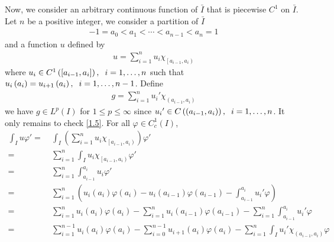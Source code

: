 \documentclass[a4paper,oneside]{article}
\numberwithin{equation}{section}
\begin{document}
\begin{enumerate}
Now, we consider an arbitrary continuous function of $\bar{I}$ that is piecewise $C^1$ on $\bar{I}$. Let $n$ be a positive integer, we consider a partition of $\bar{I}$ 
\begin{align}
- 1 = {a_0} < {a_1} <  \cdots  < {a_{n - 1}} < {a_n} = 1
\end{align}
and a function $u$ defined by
\begin{align}
u = \sum\limits_{i = 1}^n {{u_i}{\chi _{\left[ {{a_{i - 1}},{a_i}} \right)}}} 
\end{align}
where ${u_i} \in {C^1}\left( {\left[ {{a_{i - 1}},{a_i}} \right]} \right),\hspace{0.2cm} i = 1, \ldots ,n$ such that ${u_i}\left( {{a_i}} \right) = {u_{i + 1}}\left( {{a_i}} \right),\hspace{0.2cm}i = 1, \ldots ,n - 1$. Define 
\begin{align}
g = \sum\limits_{i = 1}^n {{u_i}'{\chi _{\left( {{a_{i - 1}},{a_i}} \right)}}} 
\end{align}
we have $g \in {L^p}\left( I \right)$ for $1\le p\le \infty$ since ${u_i}' \in C\left( {\left( {{a_{i - 1}},{a_i}} \right)} \right),\hspace{0.2cm} i = 1, \ldots ,n$. It only remains to check \eqref{1.5}. For all $\varphi \in C_c^1\left(I\right)$,
\begin{align}
\int_I {u\varphi '}  =&\ \int_I {\left( {\sum\limits_{i = 1}^n {{u_i}{\chi _{\left[ {{a_{i - 1}},{a_i}} \right)}}} } \right)\varphi '} \\
 =&\ \sum\limits_{i = 1}^n {\int_I {{u_i}{\chi _{\left[ {{a_{i - 1}},{a_i}} \right)}}\varphi '} } \\
 =&\ \sum\limits_{i = 1}^n {\int_{{a_{i - 1}}}^{{a_i}} {{u_i}\varphi '} } \\
 =&\ \sum\limits_{i = 1}^n {\left( {{u_i}\left( {{a_i}} \right)\varphi \left( {{a_i}} \right) - {u_i}\left( {{a_{i - 1}}} \right)\varphi \left( {{a_{i - 1}}} \right) - \int_{{a_{i - 1}}}^{{a_i}} {{u_i}'\varphi } } \right)} \\
 =&\ \sum\limits_{i = 1}^n {{u_i}\left( {{a_i}} \right)\varphi \left( {{a_i}} \right)}  - \sum\limits_{i = 1}^n {{u_i}\left( {{a_{i - 1}}} \right)\varphi \left( {{a_{i - 1}}} \right)}  - \sum\limits_{i = 1}^n {\int_{{a_{i - 1}}}^{{a_i}} {{u_i}'\varphi } } \\
 =&\ \sum\limits_{i = 1}^{n - 1} {{u_i}\left( {{a_i}} \right)\varphi \left( {{a_i}} \right)}  - \sum\limits_{i = 0}^{n - 1} {{u_{i + 1}}\left( {{a_i}} \right)\varphi \left( {{a_i}} \right)}  - \sum\limits_{i = 1}^n {\int_I {{u_i}'{\chi _{\left( {{a_{i - 1}},{a_i}} \right)}}\varphi } } \\

\end{align}
\end{enumerate}
\end{document}
